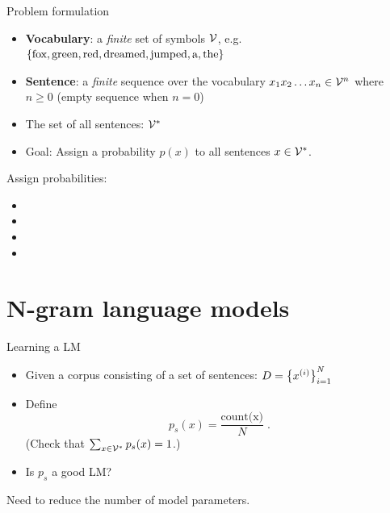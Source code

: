 \documentclass[usenames,dvipsnames,notes]{beamer}
\begin{document}
\begin{frame}
    {Problem formulation}
    \begin{itemize}
        \item \textbf{Vocabulary}: a \textit{finite} set of symbols $\mathcal{V}$, e.g.\\
            \indent $\left\{ \text{fox}, \text{green}, \text{red}, \text{dreamed}, \text{jumped}, \text{a}, \text{the} \right\}$
        \item \textbf{Sentence}: a \textit{finite} sequence over the vocabulary $x_1 x_2 \ldots x_n \in \mathcal{V}^n$ where $n\ge 0$ (empty sequence when $n=0$)
        \item The set of all sentences: $\mathcal{V}^*$ 
        \item Goal: Assign a probability $p(x)$ to all sentences $x\in\mathcal{V}^*$. 
    \end{itemize}

    \pause
    Assign probabilities:\\
    \begin{itemize}
        \item[] 
        \item[] 
        \item[] 
        \item[] 
    \end{itemize}
\end{frame}

\section{N-gram language models}

\begin{frame}
    {Learning a LM}
    \begin{itemize}
        \itemsep1em
        \item Given a corpus consisting of a set of sentences: $D=\left\{ x^{(i)} \right\}_{i=1}^N$
        \item Define
            $$
            p_s(x) = \frac{\text{count(x)}}{N} \;.
            $$
            (Check that $\sum_{x\in\mathcal{V}^*}p_s(x) = 1$.)
        \item Is $p_s$ a good LM?
    \end{itemize}
    \vspace{4em}
    \pause
    Need to reduce the number of model parameters.
\end{frame}
\end{document}
